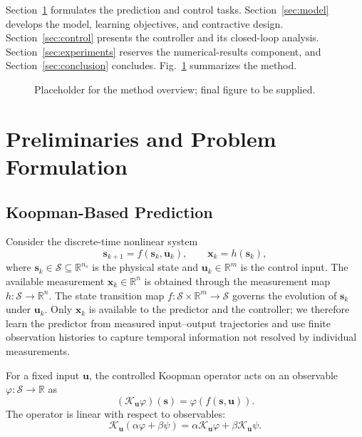 \documentclass[journal]{IEEEtran}
\theoremstyle{plain}
\theoremstyle{definition}
\newcommand{\vx}{\mathbf{x}}
\newcommand{\vu}{\mathbf{u}}
\newcommand{\vs}{\mathbf{s}}
\newcommand{\R}{\mathbb{R}}
\begin{document}
Section~\ref{sec:prelim} formulates the prediction and control tasks. Section~\ref{sec:model} develops the model, learning objectives, and contractive design. Section~\ref{sec:control} presents the controller and its closed-loop analysis. Section~\ref{sec:experiments} reserves the numerical-results component, and Section~\ref{sec:conclusion} concludes. Fig.~\ref{fig:overview} summarizes the method.

\begin{figure}[!t]
\centering
\fbox{\rule{0pt}{80mm}\rule{0.95\textwidth}{0pt}}
\caption{Placeholder for the method overview; final figure to be supplied.}
\label{fig:overview}
\end{figure}

\section{Preliminaries and Problem Formulation}
\label{sec:prelim}
\subsection{Koopman-Based Prediction}
\label{subsec:koopman_prelim}
Consider the discrete-time nonlinear system
\begin{equation}
\vs_{k+1}=f(\vs_k,\vu_k),\qquad \vx_k=h(\vs_k),
\label{eq:nonlinear_system}
\end{equation}
where $\vs_k\in\mathcal S\subseteq\R^{n_s}$ is the physical state and $\vu_k\in\R^m$ is the control input. The available measurement $\vx_k\in\R^n$ is obtained through the measurement map $h:\mathcal S\to\R^n$. The state transition map $f:\mathcal S\times\R^m\to\mathcal S$ governs the evolution of $\vs_k$ under $\vu_k$. Only $\vx_k$ is available to the predictor and the controller; we therefore learn the predictor from measured input--output trajectories and use finite observation histories to capture temporal information not resolved by individual measurements.

For a fixed input $\vu$, the controlled Koopman operator acts on an observable $\varphi:\mathcal S\to\R$ as \cite{koopman1931hamiltonian,mezic2005spectral,brunton2022modern}
\begin{equation}
(\mathcal K_{\vu}\varphi)(\vs)=\varphi(f(\vs,\vu)).
\label{eq:koopman_operator}
\end{equation}
The operator is linear with respect to observables:
\begin{equation}
\mathcal K_{\vu}(\alpha\varphi+\beta\psi)=\alpha\mathcal K_{\vu}\varphi+\beta\mathcal K_{\vu}\psi.
\label{eq:koopman_linearity}
\end{equation}
\end{document}
